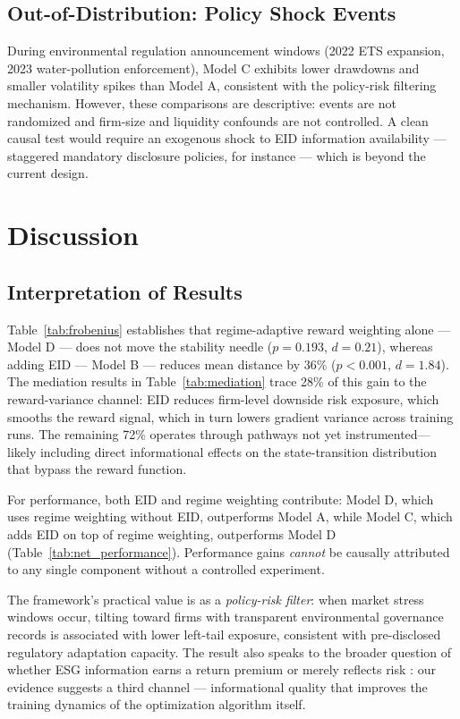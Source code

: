 \documentclass[12pt]{article}
\begin{document}
\subsection{Out-of-Distribution: Policy Shock Events}

During environmental regulation announcement windows (2022 ETS
expansion, 2023 water-pollution enforcement), Model C exhibits lower
drawdowns and smaller volatility spikes than Model A, consistent with
the policy-risk filtering mechanism. However, these comparisons are
descriptive: events are not randomized and firm-size and liquidity
confounds are not controlled. A clean causal test would require an exogenous shock to EID information
availability --- staggered mandatory disclosure policies, for instance
--- which is beyond the current design.

\section{Discussion}
\label{sec:discussion}

\subsection{Interpretation of Results}

Table~\ref{tab:frobenius} establishes that regime-adaptive reward
weighting alone --- Model D --- does not move the stability needle
($p=0.193$, $d=0.21$), whereas adding EID --- Model B --- reduces
mean distance by 36\% ($p<0.001$, $d=1.84$). The mediation results in
Table~\ref{tab:mediation} trace 28\% of this gain to the
reward-variance channel: EID reduces firm-level downside risk
exposure, which smooths the reward signal, which in turn lowers
gradient variance across training runs. The remaining 72\% operates
through pathways not yet instrumented---likely including direct
informational effects on the state-transition distribution that bypass
the reward function.

For performance, both EID and regime weighting contribute: Model D,
which uses regime weighting without EID, outperforms Model A, while
Model C, which adds EID on top of regime weighting, outperforms Model D
(Table~\ref{tab:net_performance}). Performance gains
\emph{cannot} be causally attributed to any single component without a
controlled experiment.

The framework's practical value is as a \emph{policy-risk filter}: when
market stress windows occur, tilting toward firms with transparent
environmental governance records is associated with lower left-tail
exposure, consistent with pre-disclosed regulatory adaptation capacity.
The result also speaks to the broader question of whether ESG
information earns a return premium or merely reflects risk
\citep{pastor2021,bolton2021carbon}: our evidence suggests a third
channel --- informational quality that improves the training dynamics
of the optimization algorithm itself.
\end{document}
